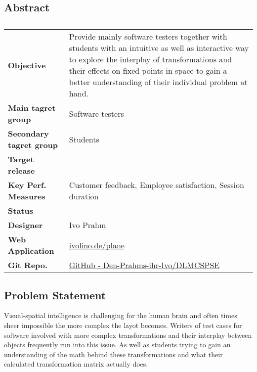 \subsection{Abstract}

\bgroup
\def\arraystretch{1.5}
\setlength\arrayrulewidth{1.2pt}
\color{default}
\begin{xltabular}{\textwidth}{|p{3cm}|X|}
\caption*{} \label{tab:Abstract} \\
\hline

 \textbf{Objective} & {\color{textgray} Provide mainly software testers together with students with an intuitive as well as interactive way to explore the interplay of transformations and their effects on fixed points in space to gain a better understanding of their individual problem at hand.} \\ \hline  

 \textbf{Main tagret group} & {\color{textgray} Software testers} \\ \hline 
{} \textbf{Secondary tagret group} & {\color{textgray} Students} \\ \hline 
{} \textbf{Target release} &  \\ \hline 

 \textbf{Key Perf. Measures} & {\color{textgray} Customer feedback, Employee satisfaction, Session duration} \\ \hline 

 \textbf{Status} &  \\ \hline 

 \textbf{Designer} & {\color{textgray} Ivo Prahm} \\ \hline 
{} \textbf{Web Application} & {\color{textblue} \href{https://ivolino.de/plane}{ivolino.de/plane}} \\ \hline  
{} \textbf{Git Repo.} & {\color{textblue} \href{https://github.com/Den-Prahms-ihr-Ivo/DLMCSPSE}{GitHub - Den-Prahms-ihr-Ivo/DLMCSPSE } } \\ \hline 


\end{xltabular} 
\egroup 
\color{default}


\subsection{Problem Statement}
Visual-spatial intelligence is challenging for the human brain and often times sheer impossible the more complex the layot becomes. Writers of test cases for software involved with more complex transformations and their interplay between objects frequently run into this issue. As well as students trying to gain an understanding of the math behind these transformations and what their calculated transformation matrix actually does.

